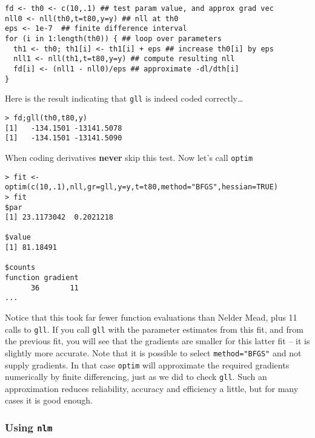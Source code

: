 \documentclass[10pt] {article}
\theoremstyle{definition}
\begin{document}
\begin{lstlisting}
fd <- th0 <- c(10,.1) ## test param value, and approx grad vec
nll0 <- nll(th0,t=t80,y=y) ## nll at th0
eps <- 1e-7  ## finite difference interval 
for (i in 1:length(th0)) { ## loop over parameters
  th1 <- th0; th1[i] <- th1[i] + eps ## increase th0[i] by eps
  nll1 <- nll(th1,t=t80,y=y) ## compute resulting nll
  fd[i] <- (nll1 - nll0)/eps ## approximate -dl/dth[i]
}
\end{lstlisting}
Here is the result indicating that {\tt gll} is indeed coded correctly\ldots
\begin{lstlisting}
> fd;gll(th0,t80,y)
[1]   -134.1501 -13141.5078
[1]   -134.1501 -13141.5090
\end{lstlisting}
When coding derivatives {\bf never} skip this test. Now let's call {\tt optim}
\begin{lstlisting}
> fit <- optim(c(10,.1),nll,gr=gll,y=y,t=t80,method="BFGS",hessian=TRUE)
> fit
$par
[1] 23.1173042  0.2021218

$value
[1] 81.18491

$counts
function gradient 
      36       11 
...
\end{lstlisting}
Notice that this took far  fewer function evaluations than Nelder Mead, plus 11 calls to {\tt gll}. If you call {\tt gll} with the parameter estimates from this fit, and from the previous fit, you will see that the gradients are smaller for this latter fit -- it is slightly more accurate. Note that it is possible to select \lstinline+method="BFGS"+ and not supply gradients. In that case {\tt optim} will approximate the required gradients numerically by finite differencing, just as we did to check {\tt gll}. Such an approximation reduces reliability, accuracy and efficiency a little, but for many cases it is good enough. 

\subsubsection{Using {\tt nlm}}
\end{document}
